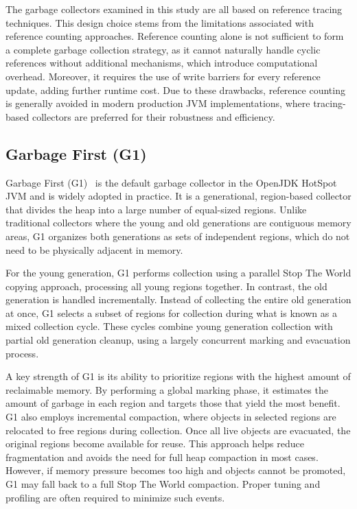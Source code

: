 The garbage collectors examined in this study are all based on reference tracing techniques. This design choice stems from the limitations associated with reference counting approaches. Reference counting alone is not sufficient to form a complete garbage collection strategy, as it cannot naturally handle cyclic references without additional mechanisms, which introduce computational overhead. Moreover, it requires the use of write barriers for every reference update, adding further runtime cost. Due to these drawbacks, reference counting is generally avoided in modern production JVM implementations, where tracing-based collectors are preferred for their robustness and efficiency.

\subsection{Garbage First (G1)}

Garbage First (G1)~\cite{detlefs2004g1} is the default garbage collector in the OpenJDK HotSpot JVM and is widely adopted in practice. It is a generational, region-based collector that divides the heap into a large number of equal-sized regions. Unlike traditional collectors where the young and old generations are contiguous memory areas, G1 organizes both generations as sets of independent regions, which do not need to be physically adjacent in memory.

For the young generation, G1 performs collection using a parallel Stop The World copying approach, processing all young regions together. In contrast, the old generation is handled incrementally. Instead of collecting the entire old generation at once, G1 selects a subset of regions for collection during what is known as a mixed collection cycle. These cycles combine young generation collection with partial old generation cleanup, using a largely concurrent marking and evacuation process.

A key strength of G1 is its ability to prioritize regions with the highest amount of reclaimable memory. By performing a global marking phase, it estimates the amount of garbage in each region and targets those that yield the most benefit. G1 also employs incremental compaction, where objects in selected regions are relocated to free regions during collection. Once all live objects are evacuated, the original regions become available for reuse. This approach helps reduce fragmentation and avoids the need for full heap compaction in most cases. However, if memory pressure becomes too high and objects cannot be promoted, G1 may fall back to a full Stop The World compaction. Proper tuning and profiling are often required to minimize such events.

